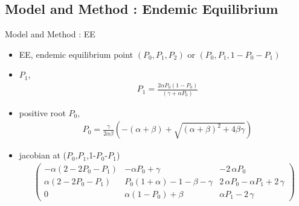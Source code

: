 \documentclass[smaller,aspectratio=169, toc=bibliography]{beamer}
\begin{document}
\subsection*{Model and Method : Endemic Equilibrium}
\begin{frame}[fragile]{Model and Method : EE }
\begin{itemize}
\item EE, endemic equilibrium point $(P_0, P_1, P_2)$ or $(P_0, P_1, 1 - P_0 - P_1 )$  

\item $P_1$, 
\begin{equation}
\label{positive root of P1}
	\begin{aligned}
	&P_1 = \frac{2\alpha P_0(1 - P_0)}{(\gamma + \alpha P_0 )}
	\end{aligned}
\end{equation}
\item positive root $P_0$,
\begin{equation}
\label{positive root of P0}
	\begin{aligned}
		&P_0 = \frac{\gamma}{2\alpha\beta}(-( \alpha + \beta ) + \sqrt{( \alpha + \beta )^2 + 4\beta\gamma})
	\end{aligned}
\end{equation}
\item jacobian at ($P_0$,$P_1$,1-$P_0$-$P_1$)
\begin{equation}
\label{jacobian at endemic equilibrium point}
\begin{aligned}
		\left(\begin{array}{rrr}
		-\alpha(2 - 2P_0 - P_1) & -\alpha P_0 + \gamma & -2 \, \alpha P_0 \\
		\alpha(2 - 2P_0 - P_1)  & P_0(1 + \alpha) -1 - \beta - \gamma & 2 \, \alpha P_0 - \alpha P_1  + 2 \, \gamma \\
		0 & \alpha(1 - P_0 ) + \beta & \alpha P_1 -2 \, \gamma
		\end{array}\right)
\end{aligned}
\end{equation}
\end{itemize}
\end{frame}
\end{document}
